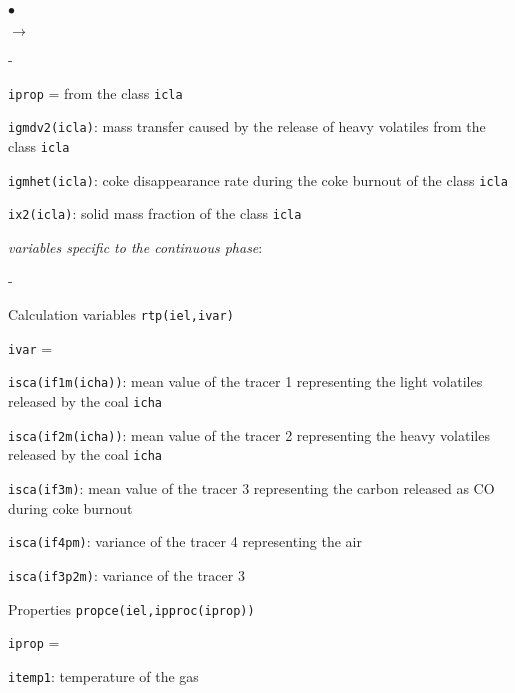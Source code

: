 {{{\begin{list}{$\bullet$}{}
\begin{list}{$\rightarrow$}{}
\begin{list}{}{}
\begin{list}{-}{}
\begin{list}{\texttt{iprop} = }{}
                            from the class \texttt{icla}
                      \item \texttt{igmdv2(icla)}: mass transfer
                            caused by the release of heavy volatiles
                            from the class \texttt{icla}
                      \item \texttt{igmhet(icla)}: coke
                            disappearance rate during the coke burnout
                            of the class \texttt{icla}
                      \item \texttt{ix2(icla)}: solid mass fraction
                            of the class \texttt{icla}
                     \end{list}
              \end{list}
              \item {\em variables specific to the continuous phase}:
              \begin{list}{-}{}
               \item Calculation variables \texttt{rtp(iel,ivar)}
                     \begin{list}{\texttt{ivar} = }{}
                      \item \texttt{isca(if1m(icha))}: mean value of
                            the tracer 1 representing the light
                            volatiles released by the coal \texttt{icha}
                      \item \texttt{isca(if2m(icha))}: mean value of
                            the tracer 2 representing the heavy
                            volatiles released by the coal \texttt{icha}
                      \item \texttt{isca(if3m)}: mean value of the
                            tracer 3 representing the carbon released as
                            CO during coke burnout
                      \item \texttt{isca(if4pm)}: variance of the
                            tracer 4 representing the air
                      \item \texttt{isca(if3p2m)}: variance of the
                            tracer 3
                     \end{list}
               \item Properties \texttt{propce(iel,ipproc(iprop))}
                     \begin{list}{\texttt{iprop} = }{}
                      \item \texttt{itemp1}: temperature of the gas

\end{list}
\end{list}
\end{list}
\end{list}
\end{list}}}}
